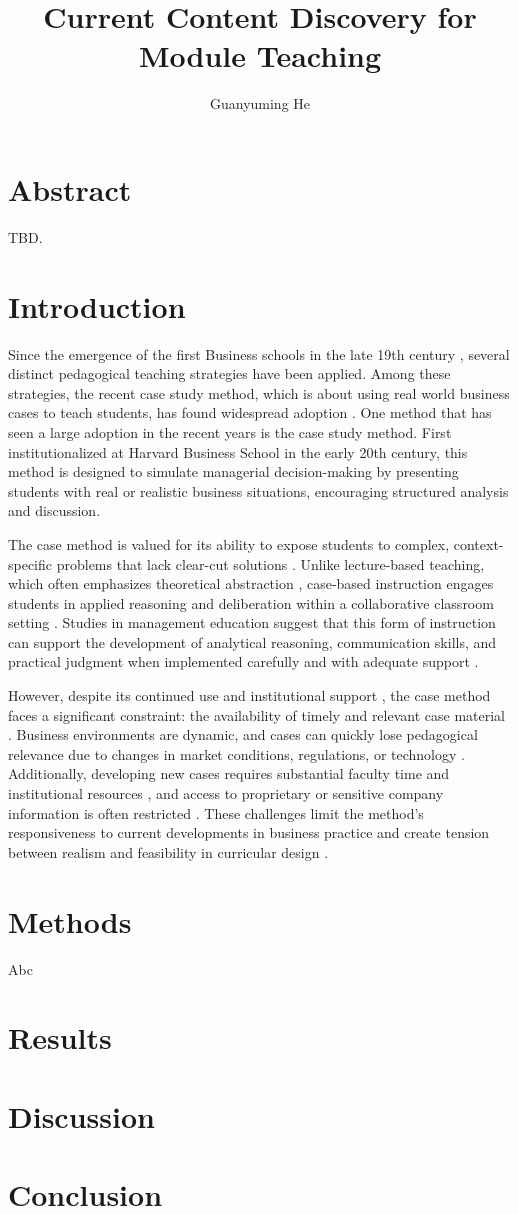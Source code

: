 \documentclass[project-plan]{report-template}
\title{Current Content Discovery for Module Teaching}
\author{Guanyuming He}
\begin{document}
\maketitlepage  

\section*{Abstract}
TBD.

\section{Introduction}
Since the emergence of the first Business schools in the late 19th century
\cite{first.bis.school.1, first.bis.school.2},
several distinct pedagogical teaching strategies have been applied. Among these
strategies, the recent case study method, which is about using real world business
cases to teach students, has found widespread adoption \cite{???}. 
One method that has seen a large adoption \cite{???} in the recent years is the
case study method.  First institutionalized at Harvard Business School in the
early 20th century, this method is designed to simulate managerial
decision-making by presenting students with real or realistic business
situations, encouraging structured analysis and discussion.

The case method is valued for its ability to expose students to complex,
context-specific problems that lack clear-cut solutions \cite{???}. Unlike
lecture-based teaching, which often emphasizes theoretical abstraction
\cite{???}, case-based instruction engages students in applied reasoning and
deliberation within a collaborative classroom setting \cite{???}. Studies in
management education suggest that this form of instruction can support the
development of analytical reasoning, communication skills, and practical
judgment when implemented carefully and with adequate support \cite{???}.

However, despite its continued use and institutional support \cite{???}, the
case method faces a significant constraint: the availability of timely and
relevant case material \cite{???}. Business environments are dynamic, and cases
can quickly lose pedagogical relevance due to changes in market conditions,
regulations, or technology \cite{???}. Additionally, developing new cases
requires substantial faculty time and institutional resources \cite{???}, and
access to proprietary or sensitive company information is often restricted
\cite{???}. These challenges limit the method’s responsiveness to current
developments in business practice and create tension between realism and
feasibility in curricular design \cite{???}.

\section{Methods}
Abc

\section{Results}

\section{Discussion}

\section{Conclusion}


\end{document}
